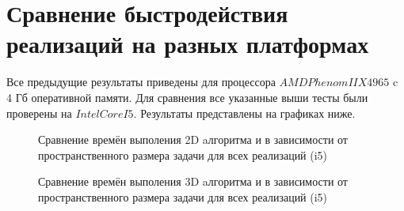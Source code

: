 \documentclass[10pt]{article}
\begin{document}
\section{Сравнение быстродействия реализаций на разных
  платформах}
Все предыдущие результаты приведены для процессора $AMD Phenom II X4 965$ c 4 Гб
оперативной памяти. Для сравнения все указанные выши тесты были проверены
на $Intel Core I5$. Результаты представлены на графиках ниже.
\begin{figure}[h]
\begin{minipage}[h]{0.99\textwidth}
\end{minipage}
\caption{Сравнение времён выполения 2D aлгоритма и в зависимости 
  от пространственного размера задачи для всех реализаций (i5)}
\label{2D_i5}
\end{figure}
\begin{figure}[h]
\begin{minipage}[h]{0.99\textwidth}
\end{minipage}
\caption{Сравнение времён выполения 3D aлгоритма и в зависимости 
  от пространственного размера задачи для всех реализаций (i5)}
\label{3D_i5}
\end{figure}
\end{document}
